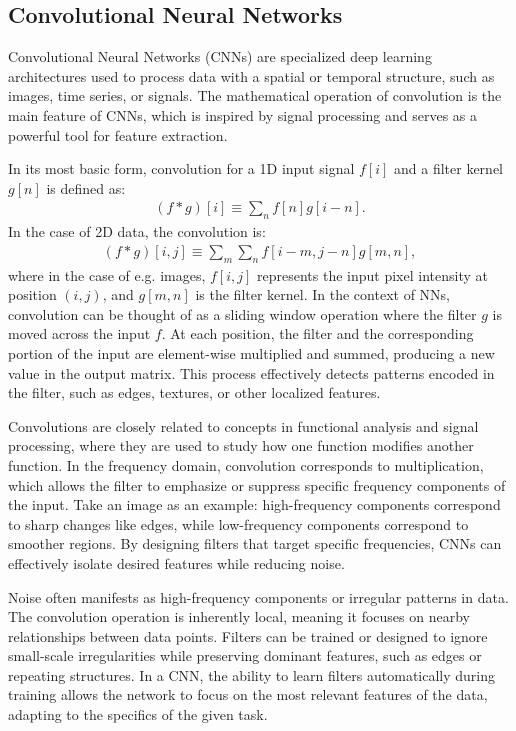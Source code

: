 \documentclass[%
reprint,
amsmath,amssymb,
aps,
]{revtex4-2}
\begin{document}
\subsection{Convolutional Neural Networks}  
Convolutional Neural Networks (CNNs) are specialized deep learning architectures used to process data with a spatial or temporal structure, such as images, time series, or signals. The mathematical operation of convolution is the main feature of CNNs, which is inspired by signal processing and serves as a powerful tool for feature extraction.

In its most basic form, convolution for a 1D input signal $f[i]$ and a filter kernel $g[n]$ is defined as:
\begin{align}
	(f*g)[i]\equiv\sum_{n}f[n]g[i-n].
\end{align}
In the case of 2D data, the convolution is:
\begin{align}
	(f*g)[i,j]\equiv\sum_{m}\sum_{n}f[i-m,j-n]g[m,n],
\end{align}
where in the case of e.g. images, $f[i,j]$ represents the input pixel intensity at position $(i,j)$, and $g[m,n]$ is the filter kernel. In the context of NNs, convolution can be thought of as a sliding window operation where the filter $g$ is moved across the input $f$. At each position, the filter and the corresponding portion of the input are element-wise multiplied and summed, producing a new value in the output matrix. This process effectively detects patterns encoded in the filter, such as edges, textures, or other localized features.

Convolutions are closely related to concepts in functional analysis and signal processing, where they are used to study how one function modifies another function. In the frequency domain, convolution corresponds to multiplication, which allows the filter to emphasize or suppress specific frequency components of the input. Take an image as an example: high-frequency components correspond to sharp changes like edges, while low-frequency components correspond to smoother regions. By designing filters that target specific frequencies, CNNs can effectively isolate desired features while reducing noise.

Noise often manifests as high-frequency components or irregular patterns in data. The convolution operation is inherently local, meaning it focuses on nearby relationships between data points. Filters can be trained or designed to ignore small-scale irregularities while preserving dominant features, such as edges or repeating structures. In a CNN, the ability to learn filters automatically during training allows the network to focus on the most relevant features of the data, adapting to the specifics of the given task.
\end{document}
